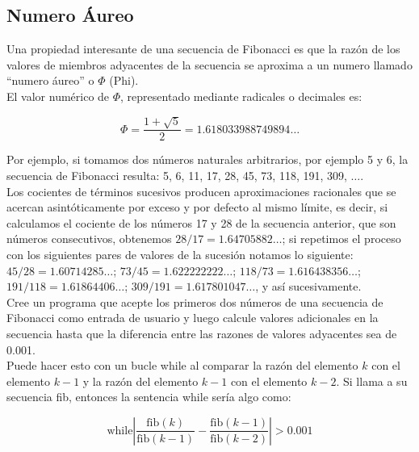 \documentclass{article}
\begin{document}
	\newpage
	
	\subsection{Numero Áureo}
	
	Una propiedad interesante de una secuencia de Fibonacci es que la razón de los valores de miembros adyacentes de la secuencia se aproxima a un numero llamado “numero áureo” o $\Phi$ (Phi).
	\\
	
	El valor numérico de $\Phi$, representado mediante radicales o decimales es:
	
	\begin{equation*}
	\Phi = \frac{1 + \sqrt{5}}{2} = 1.618033988749894 \dots
	\end{equation*}
	
	Por ejemplo, si tomamos dos números naturales arbitrarios, por ejemplo 5 y 6, la secuencia de Fibonacci resulta: 5, 6, 11, 17, 28, 45, 73, 118, 191, 309, $\ldots$.
	\\
	
	Los cocientes de términos sucesivos producen aproximaciones racionales que se acercan asintóticamente por exceso y por defecto al mismo límite, es decir, si calculamos el cociente de los números 17 y 28 de la secuencia anterior, que son números consecutivos, obtenemos $28/17 = 1.64705882 \ldots$; si repetimos el proceso con los siguientes pares de valores de la sucesión notamos lo siguiente: $45/28 = 1.60714285 \ldots$; $73/45 = 1.622222222 \ldots$; $118/73 = 1.616438356 \ldots$; $191/118 = 1.61864406 \ldots$; $309/191 = 1.617801047 \ldots$, y así sucesivamente.
	\\
	
	Cree un programa que acepte los primeros dos números de una secuencia de Fibonacci como entrada de usuario y luego calcule valores adicionales en la secuencia hasta que la diferencia entre las razones de valores adyacentes sea de 0.001.
	\\
	
	Puede hacer esto con un bucle while al comparar la razón del elemento $k$ con el elemento $k-1$ y la razón del elemento $k-1$ con el elemento $k-2$. Si llama a su secuencia fib, entonces la sentencia while sería algo como:
	
	\begin{equation*}
		\text{while} \left|\frac{\text{fib}(k)}{\text{fib}(k - 1)} - \frac{\text{fib}(k - 1)}{\text{fib}(k - 2)}\right| > 0.001
	\end{equation*}
	
\end{document}
